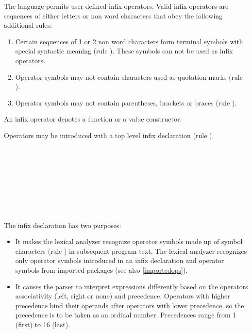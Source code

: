 The \frege{} language permits user defined infix operators.
Valid infix operators are sequences of either letters or non word characters that obey the following additional rules:

\begin{enumerate}

\item Certain sequences of 1 or 2 non word characters form
terminal symbols with special syntactic meaning
(rule ).
These symbols can not be used as infix operators.

\item Operator symbols may not contain characters used as quotation
marks (rule ).

\item Operator symbols may not contain parentheses, brackets or braces (rule ).

\end{enumerate}

An infix operator denotes a function or a
value constructor.

Operators may be introduced with a top level infix declaration (rule ).

\begin{flushleft}
   
\\
  \oder{}  \oder{} \\
 \regex{[123456789]} \oder{} \\

  \\
 \\
  \oder{} \\
   \oder{} \\

\end{flushleft}

The infix declaration has two purposes:

\begin{itemize}
\item It makes the lexical analyzer recognize operator symbols made up of symbol characters (rule ) in subsequent program text. The lexical analyzer recognizes only operator symbols introduced in an infix declaration and operator symbols from imported packages (see also \autoref{importedops}).

\item It causes the parser to interpret expressions differently based on the operators associativity (left, right or none) and precedence.
Operators with higher precedence bind their operands after operators with lower precedence, so the precedence is to be taken as an ordinal number.
Precedences range from 1 (first) to 16 (last).

\end{itemize}

